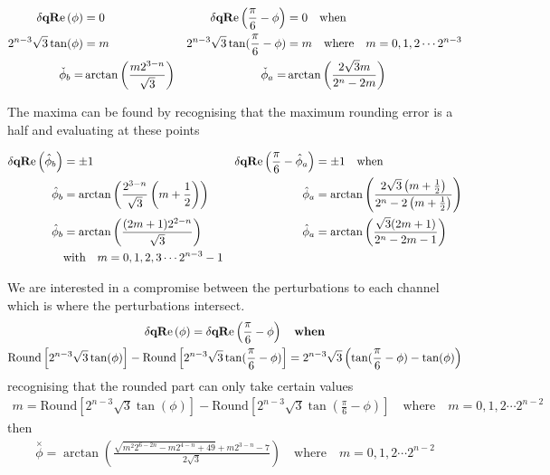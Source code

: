 \begin{align*}
\dqRe[\phi] & = 0 & \dqRe[\Pii{6}-\phi] & = 0 \quad \text{when} \\
2^{n-3}\sqrt{3} \tan (\phi ) & = m & 
2^{n-3}\sqrt{3} \tan (\Pii{6}-\phi ) &= m \quad \text{where}\quad m=0,1,2 \cdots 2^{n-3} \\
 \check{\phi}_{b} = & \arctan\left(\frac{m 2^{3-n}}{\sqrt{3}}  \right) &
 \check{\phi}_{a} = & \arctan\left(\frac{2 \sqrt{3} m}{2^n - 2 m}\right) 
\end{align*}

The maxima can be found by recognising that the maximum rounding error is a half and evaluating at these points

\begin{align*}
\dqRe[\hat{\phi}_{b} ] & = \pm 1 & \dqRe[\Pii{6}-\hat{\phi}_{a} ] & = \pm 1  \quad \text{when} \\
\hat{\phi}_{b} & =\arctan\left(\frac{ 2^{3-n} }{\sqrt{3}} \left(m+\frac{1}{2}\right) \right) &
\hat{\phi}_{a} & = \arctan\left(\frac{2 \sqrt{3} \left(m+\frac{1}{2}\right)}{2^n - 2 \left(m+\frac{1}{2}\right)}\right)  \\
 \hat{\phi}_{b}  &=  \arctan\left(\frac{(2 m+1) 2^{2-n}}{\sqrt{3}}          \right) &
  \hat{\phi}_{a}  &=  \arctan\left(\frac{\sqrt{3} (2 m+1)}{2^n-2 m-1}  \right) \\
  \quad&\text{with}\quad   m =  0,1,2,3 \cdots2^{n-3}-1 
\end{align*}

We are interested in a compromise between the perturbations to each channel which is where the perturbations intersect. 
\begin{gather*}
\dqRe[\phi] = \dqRe[\frac{\pi}{6} -\phi]  \quad \textbf{when}\\
\text{Round}\left[ 2^{n-3}\sqrt{3} \tan (\phi ) \right] - \text{Round}\left[ 2^{n-3}\sqrt{3} \tan (\frac{\pi}{6} - \phi ) \right] 
=  2^{n-3}\sqrt{3} \left( \tan (\frac{\pi}{6} - \phi ) - \tan (\phi ) \right) 
\end{gather*}
recognising that the rounded part can only take certain values
\begin{gather*}
m =  \text{Round}\left[ 2^{n-3}\sqrt{3} \tan (\phi ) \right] - \text{Round}\left[ 2^{n-3}\sqrt{3} \tan (\frac{\pi}{6} - \phi ) \right]
 \quad \text{where}\quad m=0,1,2 \cdots 2^{n-2}
 \end{gather*}
then
\begin{gather*}
\overset{\times}{\phi} =\arctan\left(\frac{\sqrt{m^2 2^{6-2 n}-m 2^{4-n}+49}+m 2^{3-n}-7}{2 \sqrt{3}}\right) \quad \text{where}\quad m=0,1,2 \cdots 2^{n-2}
\end{gather*}

